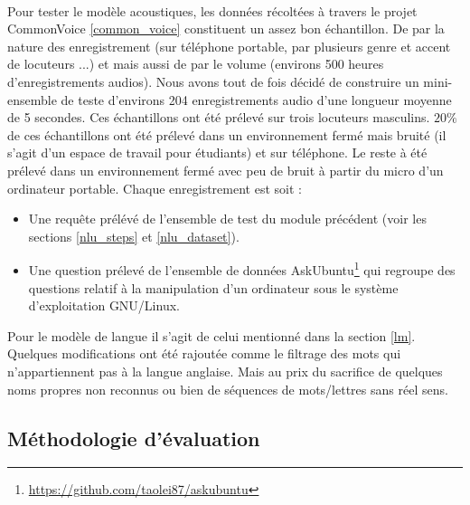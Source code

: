	\paragraph{}
	Pour tester le modèle acoustiques, les données récoltées à travers le projet CommonVoice \ref{common_voice} constituent un assez bon échantillon. De par la nature des enregistrement (sur téléphone portable, par plusieurs genre et accent de locuteurs ...) et mais aussi de par le volume (environs 500 heures d'enregistrements audios). Nous avons tout de fois décidé de construire un mini-ensemble de teste d'environs 204 enregistrements audio d'une longueur moyenne de 5 secondes. Ces échantillons ont été prélevé sur trois locuteurs masculins. $20\%$ de ces échantillons ont été prélevé dans un environnement fermé mais bruité (il s'agit d'un espace de travail pour étudiants) et sur téléphone. Le reste à été prélevé dans un environnement fermé avec peu de bruit à partir du micro d'un ordinateur portable. Chaque enregistrement est soit : 
	\begin{itemize}
		\item Une requête prélévé de l'ensemble de test du module précédent (voir les sections \ref{nlu_steps} et \ref{nlu_dataset}).
		
		\item Une question prélevé de l'ensemble de données AskUbuntu\footnote{\url{https://github.com/taolei87/askubuntu}} qui regroupe des questions relatif à la manipulation d'un ordinateur sous le système d'exploitation GNU/Linux.
	\end{itemize}
	\par
	Pour le modèle de langue il s'agit de celui mentionné dans la section \ref{lm}. Quelques modifications ont été rajoutée comme le filtrage des mots qui n'appartiennent pas à la langue anglaise. Mais au prix du sacrifice de quelques noms propres non reconnus ou bien de séquences de mots/lettres sans réel sens.
	\subsection{Méthodologie d'évaluation}
